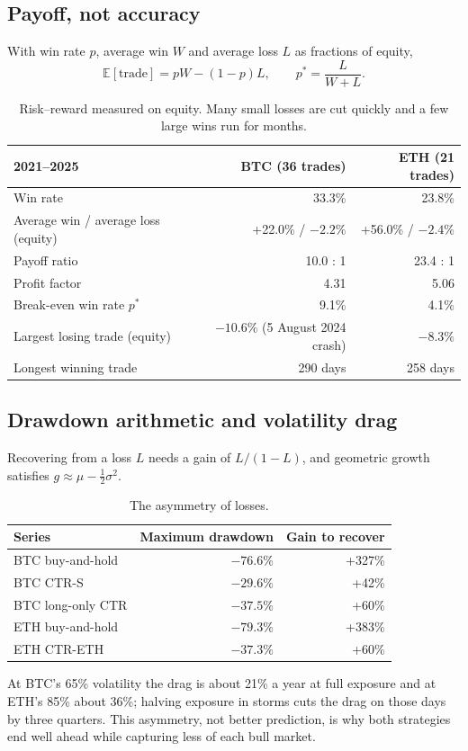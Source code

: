 \documentclass[11pt,a4paper]{article}
\theoremstyle{definition}
\begin{document}
\subsection{Payoff, not accuracy}
With win rate $p$, average win $W$ and average loss $L$ as fractions of equity,
\begin{equation}
\mathbb E[\text{trade}]=pW-(1-p)L,\qquad p^*=\frac{L}{W+L}.
\end{equation}
\begin{table}[htbp]\centering\small
\begin{tabular}{@{}lrr@{}}
\toprule
\textbf{2021--2025} & \textbf{BTC (36 trades)} & \textbf{ETH (21 trades)}\\
\midrule
Win rate & 33.3\% & 23.8\%\\
Average win / average loss (equity) & +22.0\% / $-2.2\%$ & +56.0\% / $-2.4\%$\\
Payoff ratio & 10.0 : 1 & 23.4 : 1\\
Profit factor & 4.31 & 5.06\\
Break-even win rate $p^*$ & 9.1\% & 4.1\%\\
Largest losing trade (equity) & $-10.6\%$ (5 August 2024 crash) & $-8.3\%$\\
Longest winning trade & 290 days & 258 days\\
\bottomrule
\end{tabular}
\caption{Risk--reward measured on equity. Many small losses are cut quickly and a few large wins run for months.}
\end{table}

\subsection{Drawdown arithmetic and volatility drag}
Recovering from a loss $L$ needs a gain of $L/(1-L)$, and geometric growth satisfies $g\approx\mu-\tfrac12\sigma^2$.
\begin{table}[htbp]\centering\small
\begin{tabular}{@{}lrr@{}}
\toprule
\textbf{Series} & \textbf{Maximum drawdown} & \textbf{Gain to recover}\\
\midrule
BTC buy-and-hold & $-76.6\%$ & +327\%\\
BTC CTR-S & $-29.6\%$ & +42\%\\
BTC long-only CTR & $-37.5\%$ & +60\%\\
ETH buy-and-hold & $-79.3\%$ & +383\%\\
ETH CTR-ETH & $-37.3\%$ & +60\%\\
\bottomrule
\end{tabular}
\caption{The asymmetry of losses.}
\end{table}
At BTC's 65\% volatility the drag is about 21\% a year at full exposure and at ETH's 85\% about 36\%; halving exposure in storms cuts the drag on those days by three quarters. This asymmetry, not better prediction, is why both strategies end well ahead while capturing less of each bull market.
\end{document}
